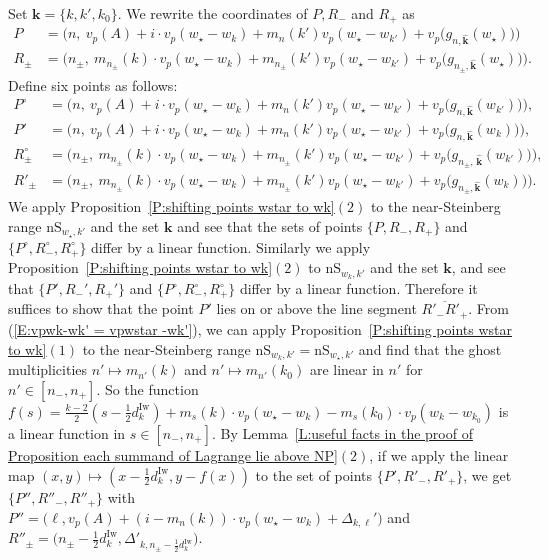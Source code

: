 \documentclass[12pt]{amsart}
\theoremstyle{definition}
\numberwithin{equation}{subsection}
\def\bfk{\mathbf{k}}
\newcommand{\Iw}{\mathrm{Iw}}
\newcommand{\nS}{\mathrm{nS}}
\begin{document}
Set $\bfk=\{k,k',k_0 \}$. We rewrite the coordinates of $P,R_-$ and $R_+$ as 
\begin{align*}
P&=\big(n,\ v_p(A)+i\cdot v_p(w_\star-w_k)+m_n(k')v_p(w_\star-w_{k'})+v_p\big(g_{n,\hat{ \bfk}}(w_\star) \big) \big)\\
R_\pm&= \big(n_\pm, \ m_{n_\pm}(k)\cdot v_p(w_\star-w_k)+m_{n_\pm}(k')v_p(w_\star-w_{k'})+v_p\big(g_{n_\pm,\hat{ \bfk}}(w_\star) \big) \big).
\end{align*}
Define six points as follows:
\begin{align*}
P^\circ&=\big( n,\ v_p(A)+i\cdot v_p(w_\star-w_k)+m_n(k')v_p(w_\star-w_{k'})+v_p\big(g_{n,\hat{ \bfk}}(w_{k'}) \big) \big),\\
P'&=\big( n,\ v_p(A)+i\cdot v_p(w_\star-w_k)+m_n(k')v_p(w_\star-w_{k'})+v_p\big(g_{n,\hat{ \bfk}}(w_{k}) \big) \big),\\
R^\circ_\pm&= \big(n_\pm, \ m_{n_\pm}(k)\cdot v_p(w_\star-w_k)+m_{n_\pm}(k')v_p(w_\star-w_{k'})+v_p\big(g_{n_\pm,\,\hat{ \bfk}}(w_{k'}) \big) \big),\\
R'_\pm&= \big(n_\pm,\  m_{n_\pm}(k)\cdot v_p(w_\star-w_k)+m_{n_\pm}(k')v_p(w_\star-w_{k'})+v_p\big(g_{n_\pm,\hat{ \bfk}}(w_{k}) \big) \big).
\end{align*}
We apply Proposition~\ref{P:shifting points wstar to wk}$(2)$ to the near-Steinberg range $\nS_{w_\star,k'}$ and the set $\bfk$ and see that the sets of points $\{P,R_-,R_+ \}$ and $\{P^\circ,R^\circ_-,R^\circ_+  \}$ differ by a linear function. Similarly we apply Proposition~\ref{P:shifting points wstar to wk}$(2)$ to $\nS_{w_k,k'}$ and the set $\bfk$, and see that $\{P',R_-',R_+' \}$ and $\{P^\circ, R_-^\circ, R_+^\circ \}$ differ by a linear function. Therefore it suffices to show that the point $P'$ lies on or above the line segment $\overline{R'_-R'_+}$. From (\ref{E:vpwk-wk' = vpwstar -wk'}), we can apply Proposition~\ref{P:shifting points wstar to wk}$(1)$ to the near-Steinberg range $\nS_{w_k,k'}=\nS_{w_\star,k'}$ and find that the ghost multiplicities $n'\mapsto m_{n'}(k)$ and $n'\mapsto m_{n'}(k_0)$ are linear in $n'$ for $n'\in [n_-,n_+]$. So the function $f(s)=\frac{k-2}2(s-\frac 12 d_k^\Iw)+m_s(k)\cdot v_p(w_\star-w_k)-m_s(k_0)\cdot v_p(w_k-w_{k_0})$ is a linear function in $s\in [n_-,n_+]$. By Lemma~\ref{L:useful facts in the proof of Proposition each summand of Lagrange lie above NP}$(2)$, if we apply the linear map $(x,y)\mapsto (x-\frac 12 d_k^\Iw, y-f(x))$ to the set of points $\{P',R'_-,R'_+ \}$, we get $\{P'',R''_-, R''_+ \}$ with $P''=\big(\ell, v_p(A)+ (i-m_n(k))\cdot v_p(w_\star-w_k)+\Delta_{k,\ell}' \big)$ and $R''_\pm=\big(n_\pm-\frac 12 d_k^\Iw, \Delta'_{k,n_\pm-\frac 12 d_k^\Iw} \big)$.
\end{document}
